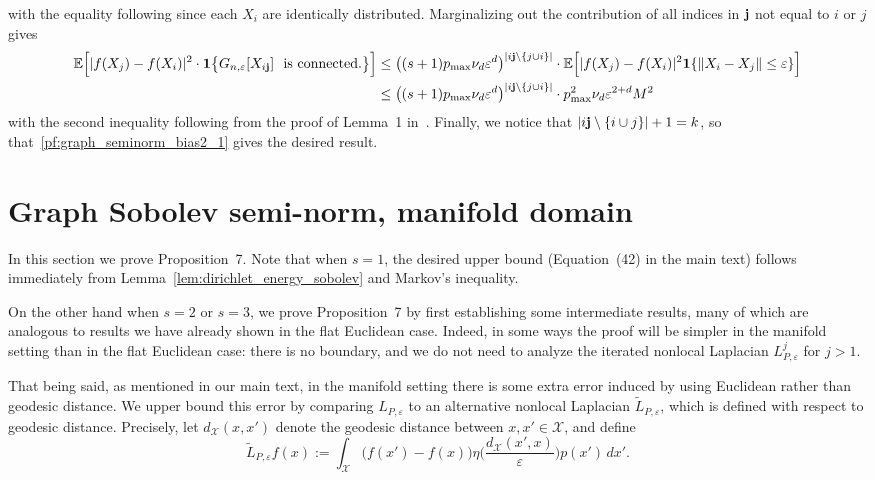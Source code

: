 \documentclass[aos]{imsart}
\theoremstyle{plain}
\theoremstyle{definition}
\theoremstyle{remark}
\newcommand{\wt}[1]{\widetilde{#1}}
\newcommand{\mc}[1]{\mathcal{#1}}
\newcommand{\1}{\mathbf{1}}
\newcommand{\bj}{{\bf j}}
\begin{document}
with the equality following since each $X_i$ are identically distributed. Marginalizing out the contribution of all indices in $\bj$ not equal to $i$ or $j$ gives
\begin{align}
\mathbb{E}\Bigl[ |f(X_j) - f(X_{i})|^2 \cdot \1\bigl\{G_{n,\varepsilon}[X_{i\bj}]~~\textrm{is connected.} \bigr\} \Bigr] & \leq \bigl((s + 1)p_{\max}\nu_d\varepsilon^d\bigr)^{|i\bj\setminus\{j \cup i\}|} \cdot \mathbb{E}\Bigl[ |f(X_j) - f(X_{i})|^2 \1\{\|X_i - X_j\| \leq \varepsilon\}\Bigr] \nonumber \\
& \leq \bigl((s + 1)p_{\max}\nu_d\varepsilon^d\bigr)^{|i\bj\setminus\{j \cup i\}|} \cdot p_{\max}^2 \nu_d \varepsilon^{2 + d} M^2 \label{pf:graph_seminorm_bias2_1}
\end{align}
with the second inequality following from the proof of Lemma~1 in~\cite{green2021}. Finally, we notice that $|i\bj\setminus \{i \cup j\}| + 1 = k$, so that~\eqref{pf:graph_seminorm_bias2_1} gives the desired result.

\section{Graph Sobolev semi-norm, manifold domain}
\label{sec:graph_quadratic_form_manifold}
In this section we prove Proposition~7. Note that when $s = 1$, the desired upper bound (Equation~(42) in the main text) follows immediately from Lemma~\ref{lem:dirichlet_energy_sobolev} and Markov's inequality. 

On the other hand when $s = 2$ or $s = 3$, we prove Proposition~7 by first establishing some intermediate results, many of which are analogous to results we have already shown in the flat Euclidean case. Indeed, in some ways the proof will be simpler in the manifold setting than in the flat Euclidean case: there is no boundary, and we do not need to analyze the iterated nonlocal Laplacian $L_{P,\varepsilon}^j$ for $j > 1$. 

That being said, as mentioned in our main text, in the manifold setting there is some extra error induced by using Euclidean rather than geodesic distance. We upper bound this error by comparing $L_{P,\varepsilon}$ to an alternative nonlocal Laplacian $\wt{L}_{P,\varepsilon}$, which is defined with respect to geodesic distance. Precisely, let $d_{\mc{X}}(x,x')$ denote the geodesic distance between $x,x' \in \mc{X}$, and define
\begin{equation*}
\wt{L}_{P,\varepsilon}f(x) := \int_{\mc{X}} \bigl(f(x') - f(x)\bigr) \eta \biggl(\frac{d_{\mc{X}}(x',x)}{\varepsilon}\biggr) p(x') \,dx'.
\end{equation*}
\end{document}
